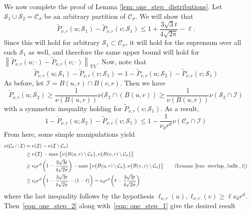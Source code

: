 \documentclass[11pt,twoside]{article}
\newcommand{\set}[1]{\left\{#1\right\}}
\newcommand{\norm}[1]{\left\lVert#1\right\rVert}
\newcommand{\1}{\mathbf{1}}
\newcommand{\Sset}{\mathcal{S}}
\newcommand{\Cset}{\mathcal{C}}
\newcommand{\Csig}{\Cset_{\sigma}}
\begin{document}
We now complete the proof of Lemma \ref{lem: one_step_distributions}. Let $\Sset_1 \cup \Sset_2 = \Csig$ be an arbitrary partition of $\Csig$. We will show that 
\begin{equation*}
\widetilde{P}_{\nu,r}(u; \Sset_1) - \widetilde{P}_{\nu,r}(v; \Sset_1) \leq 1 + \frac{3 \sqrt{3} t}{4\sqrt{2\pi}} - \ell.
\end{equation*}
Since this will hold for arbitrary $\Sset_1 \subset \Csig$, it will hold for the supremum over all such $\Sset_1$ as well, and therefore the same upper bound will hold for $\norm{\widetilde{P}_{\nu,r}(u; \cdot) - \widetilde{P}_{\nu,r}(v; \cdot)}_{\mathrm{TV}}$. Now, note that
\begin{equation*}
\widetilde{P}_{\nu,r}(u; \Sset_1) - \widetilde{P}_{\nu,r}(v; \Sset_1) = 1 - \widetilde{P}_{\nu,r}(u; \Sset_2) - \widetilde{P}_{\nu,r}(v; \Sset_1)
\end{equation*}
As before, let $\mathcal{I} = B(u,r) \cap B(v,r)$. Then we have
\begin{equation*}
\widetilde{P}_{\nu,r}(u; \Sset_2) \geq \frac{1}{\nu(B(u,r))} \nu(\Sset_2 \cap (B(u,r)) \geq \frac{1}{\nu(B(u,r))} \nu(\Sset_2 \cap \mathcal{I})
\end{equation*}
with a symmetric inequality holding for $\widetilde{P}_{\nu,r}(v; \Sset_1)$. As a result,
\begin{equation}
1 - \widetilde{P}_{\nu,r}(u; \Sset_2) - \widetilde{P}_{\nu,r}(v; \Sset_1) \leq 1 - \frac{1}{\nu_d r^d} \nu(\Csig \cap \mathcal{I}) \label{eqn: one_step_1}
\end{equation}
From here, some simple manipulations yield
\begin{align}
\nu(\Csig \cap \mathcal{I})  & = \nu(\mathcal{I}) - \nu(\mathcal{I} \setminus \Csig) \nonumber \\
& \geq \nu\bigl(\mathcal{I}\bigr) - \max \set{\nu\bigl(B(u,r) \setminus \Csig\bigr), \nu\bigl(B(v,r) \setminus \Csig\bigr)} \nonumber \\
& \geq \nu_d r^d \left(1 - \frac{3 \sqrt{3} t}{4\sqrt{2\pi}}\right) - \max \set{\nu\bigl(B(u,r) \setminus \Csig\bigr), \nu\bigl(B(v,r) \setminus \Csig\bigr)} \tag{Lemma \ref{lem: overlap_balls_1}} \\
& \geq \nu_d r^d \left(1 - \frac{3 \sqrt{3} t}{4\sqrt{2\pi}} - (1 -\ell) \right) = \nu_d r^d\left(\ell - \frac{3 \sqrt{3} t}{4\sqrt{2\pi}}\right) \label{eqn: one_step_2} 
\end{align}
where the last inequality follows by the hypothesis $\ell_{\nu,r}(u),\ell_{\nu,r}(v) \geq \ell \nu_d r^d$. Then~\eqref{eqn: one_step_2} along with~\eqref{eqn: one_step_1} give the desired result
\end{document}
